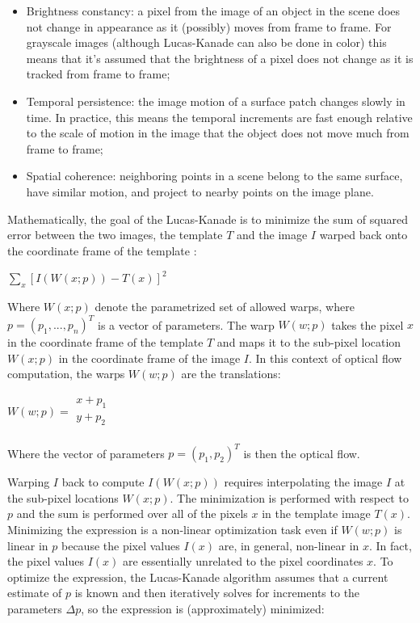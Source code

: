 \documentclass[msc, a4paper, classic, en]{ufbathesis}
\begin{document}
\begin{itemize}
  \item Brightness constancy: a pixel from the image of an object in the scene does not change in appearance as it (possibly) moves from frame to frame. For grayscale images (although Lucas-Kanade can also be done in color) this means that it's assumed that the brightness of a pixel does not change as it is tracked from frame to frame;
  \item Temporal persistence: the image motion of a surface patch changes slowly in time. In practice, this means the temporal increments are fast enough relative to the scale of motion in the image that the object does not move much from frame to frame;
  \item Spatial coherence: neighboring points in a scene belong to the same surface, have similar motion, and project to nearby points on the image plane.
\end{itemize}

Mathematically, the goal of the Lucas-Kanade is to minimize the sum of squared error between the two images, the template $T$ and the image $I$ warped back onto the coordinate frame of the template \cite{lk20}:

\begin{center}
  $\sum_{x}{[I(W(x;p))-T(x)]^2}$
\end{center}

Where $W(x;p)$ denote the parametrized set of allowed warps, where $p = (p_1,...,p_n)^T$ is a vector of parameters. The warp $W(w;p)$ takes the pixel $x$ in the coordinate frame of the template $T$ and maps it to the sub-pixel location $W(x;p)$ in the coordinate frame of the image $I$. In this context of optical flow computation, the warps $W(w;p)$ are the translations:

\begin{center}
$W(w;p) = \begin{matrix}
          x + p_1 \\
          y + p_2 \\
          \end{matrix}$
\end{center}

Where the vector of parameters $p = (p_1, p_2)^T$ is then the optical flow.

Warping $I$ back to compute $I(W(x;p))$ requires interpolating the image $I$ at the sub-pixel locations $W(x;p)$. The minimization is performed with respect to $p$ and the sum is performed over all of the pixels $x$ in the template image $T(x)$. Minimizing the expression is a non-linear optimization task even if $W(w;p)$ is linear in $p$ because the pixel values $I(x)$ are, in general, non-linear in $x$. In fact, the pixel values $I(x)$ are essentially unrelated to the pixel coordinates $x$. To optimize the expression, the Lucas-Kanade algorithm assumes that a current estimate of $p$ is known and then iteratively solves for increments to the parameters $\Delta{p}$, so the expression is (approximately) minimized:
\end{document}
